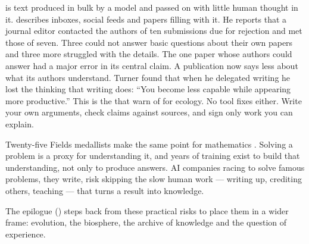  is text produced in bulk by a model and passed on with little human
thought in it. \textcite{turner2026slop} describes inboxes, social feeds and
papers filling with it. He reports that a journal editor contacted the authors
of ten submissions due for rejection and met those of seven. Three could not answer basic questions about
their own papers and three more struggled with the details. The one paper whose
authors could answer had a major error in its central claim. A publication
now says less about what its authors understand. Turner found that when he
delegated writing he lost the thinking that writing does: ``You become less
capable while appearing more productive.'' This is the  that
\textcite{mammides2026llmecology} warn of for ecology. No tool fixes either.
Write your own arguments, check claims against sources, and sign only work you
can explain.

Twenty-five Fields medallists make the same point for mathematics
\parencite{avila2026mathmisalignment}. Solving a problem is a proxy for
understanding it, and years of training exist to build that understanding, not
only to produce answers. AI companies racing to solve famous problems, they
write, risk skipping the slow human work --- writing up, crediting others,
teaching --- that turns a result into knowledge.

The epilogue () steps back from these practical risks to
place them in a wider frame: evolution, the biosphere, the archive of
knowledge and the question of experience.
